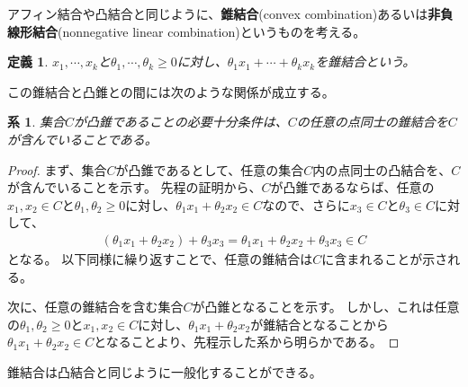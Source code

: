 \documentclass[pdflatex, ja=standard, a4paper]{bxjsarticle}
\newtheorem{definition}{定義}
\newtheorem{corollary}{系}
\begin{document}
アフィン結合や凸結合と同じように、\textbf{錐結合}(convex combination)あるいは\textbf{非負線形結合}(nonnegative linear combination)というものを考える。
\begin{definition}
    $x_1, \cdots, x_k$と$\theta_1, \cdots, \theta_k \geq 0$に対し、$\theta_1 x_1 + \cdots + \theta_k x_k$を錐結合という。
\end{definition}
\noindent
この錐結合と凸錐との間には次のような関係が成立する。
\begin{corollary}
    集合$C$が凸錐であることの必要十分条件は、$C$の任意の点同士の錐結合を$C$が含んでいることである。
\end{corollary}
\begin{proof}
    まず、集合$C$が凸錐であるとして、任意の集合$C$内の点同士の凸結合を、$C$が含んでいることを示す。
    先程の証明から、$C$が凸錐であるならば、任意の$x_1, x_2 \in C$と$\theta_1, \theta_2 \geq 0$に対し、$\theta_1 x_1 + \theta_2 x_2 \in C$なので、さらに$x_3 \in C$と$\theta_3 \in C$に対して、
    \begin{align*}
        (\theta_1 x_1 + \theta_2 x_2) + \theta_3 x_3 = \theta_1 x_1 + \theta_2 x_2 + \theta_3 x_3 \in C
    \end{align*}
    となる。
    以下同様に繰り返すことで、任意の錐結合は$C$に含まれることが示される。

    次に、任意の錐結合を含む集合$C$が凸錐となることを示す。
    しかし、これは任意の$\theta_1, \theta_2 \geq 0$と$x_1, x_2 \in C$に対し、$\theta_1 x_1 + \theta_2 x_2$が錐結合となることから$\theta_1 x_1 + \theta_2 x_2 \in C$となることより、先程示した系から明らかである。
\end{proof}
\noindent
錐結合は凸結合と同じように一般化することができる。
\end{document}
